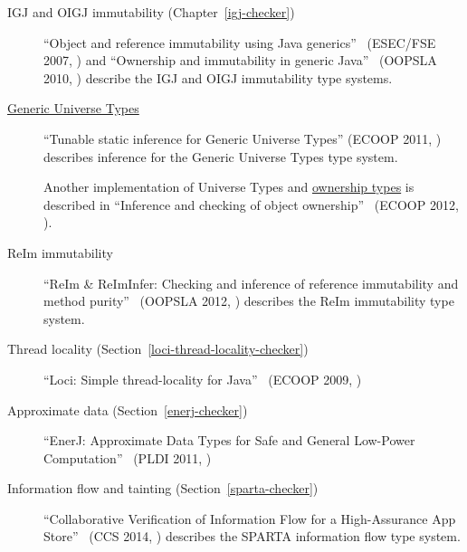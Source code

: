 \begin{description}
\item[IGJ and OIGJ immutability (Chapter~\ref{igj-checker})]
``Object and reference immutability using Java generics''~\cite{ZibinPAAKE2007} (ESEC/FSE 2007, )
and
``Ownership and immutability in generic Java''~\cite{ZibinPLAE2010} (OOPSLA 2010, )
            describe the IGJ and OIGJ immutability type systems.

\item[\href{https://ece.uwaterloo.ca/~wdietl/ownership/}{Generic Universe Types}]
``Tunable static inference for Generic Universe Types'' (ECOOP 2011, )
            describes inference for the Generic Universe Types type system.

Another implementation of Universe Types and \href{http://www.cs.rpi.edu/~huangw5/cf-inference/}{ownership types} is  described in
``Inference and checking of object ownership''~\cite{HuangDME2012} (ECOOP 2012, ).

\item[ReIm immutability]
``ReIm \& ReImInfer: Checking and inference of reference immutability and method purity''~\cite{HuangMDE2012} (OOPSLA 2012, )
            describes the ReIm immutability type system.

\item[Thread locality (Section~\ref{loci-thread-locality-checker})]
``Loci: Simple thread-locality for Java''~\cite{WrigstadPMZV2009} (ECOOP 2009, 
)

\item[Approximate data (Section~\ref{enerj-checker})]
``EnerJ: Approximate Data Types for Safe and General Low-Power Computation''~\cite{SampsonDFGCG2011} (PLDI 2011, )

\item[Information flow and tainting (Section~\ref{sparta-checker})]
``Collaborative Verification of Information Flow
for a High-Assurance App Store''~\cite{ErnstJMDPRKBBHVW2014} (CCS 2014, ) describes the SPARTA information flow type system.



\end{description}

